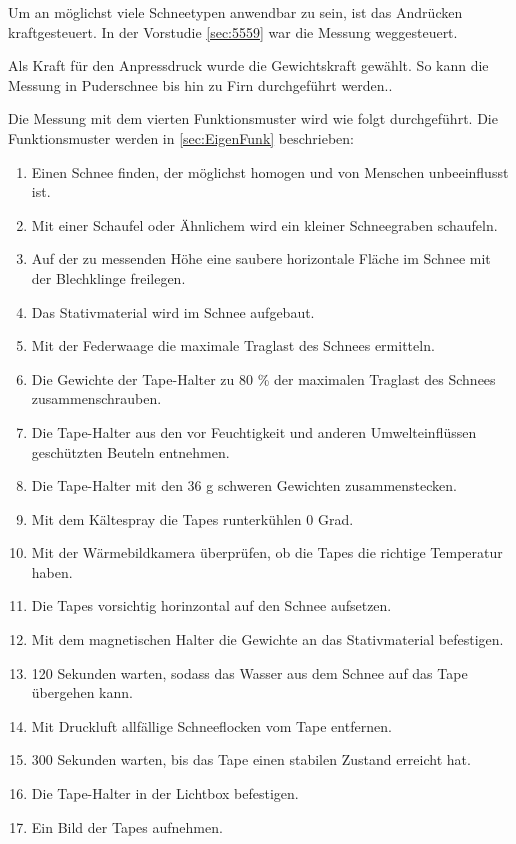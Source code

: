 

Um an möglichst viele Schneetypen anwendbar zu sein, ist das Andrücken kraftgesteuert. In der Vorstudie \ref{sec:5559} war die Messung weggesteuert.

Als Kraft für den Anpressdruck wurde die Gewichtskraft gewählt. So kann die Messung in Puderschnee bis hin zu Firn durchgeführt werden..

Die Messung mit dem vierten Funktionsmuster wird wie folgt durchgeführt. Die Funktionsmuster werden in \ref{sec:EigenFunk} beschrieben:

\begin{enumerate}
\item Einen Schnee finden, der möglichst homogen und von Menschen unbeeinflusst ist.
\item Mit einer Schaufel oder Ähnlichem wird ein kleiner Schneegraben schaufeln.
\item Auf der zu messenden Höhe eine saubere horizontale Fläche im Schnee mit der Blechklinge freilegen.
\item Das Stativmaterial wird im Schnee aufgebaut.
\item Mit der Federwaage die maximale Traglast des Schnees ermitteln.
\item Die Gewichte der Tape-Halter zu 80 \% der maximalen Traglast des Schnees zusammenschrauben.
\item Die Tape-Halter aus den vor Feuchtigkeit und anderen Umwelteinflüssen geschützten Beuteln entnehmen.
\item Die Tape-Halter mit den 36 g schweren Gewichten zusammenstecken.
\item Mit dem Kältespray die Tapes runterkühlen 0 Grad.
\item Mit der Wärmebildkamera überprüfen, ob die Tapes die richtige Temperatur haben.
\item Die Tapes vorsichtig horinzontal auf den Schnee aufsetzen.
\item Mit dem magnetischen Halter die Gewichte an das Stativmaterial befestigen.
\item 120 Sekunden warten, sodass das Wasser aus dem Schnee auf das Tape übergehen kann.
\item Mit Druckluft allfällige Schneeflocken vom Tape entfernen.
\item 300 Sekunden warten, bis das Tape einen stabilen Zustand erreicht hat.
\item Die Tape-Halter in der Lichtbox befestigen.
\item Ein Bild der Tapes aufnehmen.
\end{enumerate}
